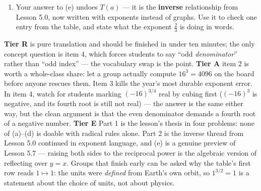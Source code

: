 \documentclass[10pt]{article}
\begin{document}
\begin{tcolorbox}[colback=white, colframe=black!40, title=\textbf{Tier E --- Extension},
    fonttitle=\bfseries, arc=1.5mm, left=3mm, right=3mm, top=2mm, bottom=2mm, breakable]
\begin{enumerate}[label=(\alph*), leftmargin=1.9em, itemsep=6pt]
        \emph{Hint:} raise both sides to the power that undoes $\frac{3}{2}$. Which power is that,
        and why does it work? 
  \item Your answer to (e) undoes $T(a)$ --- it is the \textbf{inverse} relationship from Lesson 5.0,
        now written with exponents instead of graphs. Use it to check one entry from the table, and
        state what the exponent $\frac{2}{3}$ is doing in words. 
\end{enumerate}
\end{tcolorbox}

\begin{teachernote}
\textbf{Tier R} is pure translation and should be finished in under ten minutes; the only concept
question is item 4, which forces students to say ``odd \emph{denominator}'' rather than ``odd
index'' --- the vocabulary swap is the point.
\textbf{Tier A} item 2 is worth a whole-class share: let a group actually compute $16^3=4096$ on the
board before anyone rescues them. Item 3 kills the year's most durable exponent error. In item 4,
watch for students marking $(-16)^{3/4}$ real by cubing first ($(-16)^3$ is negative, and its fourth
root is still not real) --- the answer is the same either way, but the clean argument is that the
even denominator demands a fourth root of a negative number.
\textbf{Tier E} Part 1 is the lesson's thesis in four problems: none of (a)--(d) is doable with
radical rules alone. Part 2 is the inverse thread from Lesson 5.0 continued in exponent language,
and (e) is a genuine preview of Lesson 5.7 --- raising both sides to the reciprocal power is the
algebraic version of reflecting over $y=x$. Groups that finish early can be asked why the table's
first row reads $1\mapsto 1$: the units were \emph{defined} from Earth's own orbit, so $1^{3/2}=1$
is a statement about the choice of units, not about physics.
\end{teachernote}
\end{document}
